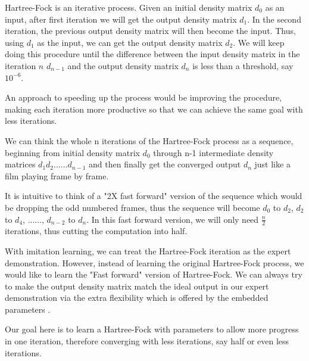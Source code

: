 \documentclass[twoside]{article}
\begin{document}

Hartree-Fock is an iterative process. Given an initial density matrix $d_0$ as an input, after first iteration we will get the output density matrix $d_1$. In the second iteration, the previous output density matrix will then become the input. Thus, using $d_1$ as the input, we can get the output density matrix $d_2$. We will keep doing this procedure until the difference between the input density matrix in the iteration $n$ $d_{n-1}$  and the output density matrix $d_n$ is less than a threshold, say $10^{-6}$. 

An approach to speeding up the process would be improving the procedure, making each iteration more productive so that we can achieve the same goal with less iterations. 

We can think the whole n iterations of the Hartree-Fock process as a sequence, beginning from initial density matrix $d_0$ through n-1 intermediate density matrices $d_1 d_2 ...... d_{n-1}$ and then finally get the converged output $d_{n}$ just like a film playing frame by frame. 

It is intuitive to think of a "2X fast forward" version of the sequence which would be dropping the odd numbered frames, thus the sequence will become $d_0$ to $d_2$, $d_2$ to $d_4$, ......, $d_{n-2}$ to $d_n$. In this fast forward version, we will only need $\frac{n}{2}$ iterations, thus cutting the computation into half.

With imitation learning,
we can treat the Hartree-Fock iteration as the expert demonstration. However, instead of learning the original Hartree-Fock process, we would like to learn the "Fast forward" version of Hartree-Fock. We can always try to make the output density matrix match the ideal output in our expert demonstration via the extra flexibility which is offered by the embedded parameters .


Our goal here is to learn a Hartree-Fock with parameters to allow more progress in one iteration, therefore converging with less iterations, say half or even less iterations.  



\end{document}
